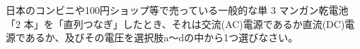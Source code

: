 日本のコンビニや100円ショップ等で売っている一般的な単 3 マンガン乾電池「2 本」を「直列つなぎ」したとき、それは交流(AC)電源であるか直流(DC)電源であるか、及びその電圧を選択肢a〜dの中から1つ選びなさい。
